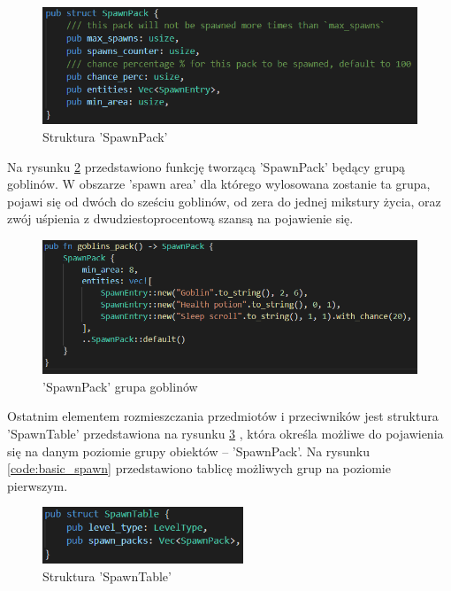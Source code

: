 \documentclass[12pt,twoside]{article}
\begin{document}
\FloatBarrier
\begin{figure}[ht]
	\centering
	\includegraphics[width=16cm]{images/code/spawn_pack.png}
	\caption{Struktura 'SpawnPack'}
	\label{code:spawn_pack}
\end{figure}
\FloatBarrier

Na rysunku \ref{code:goblins_pack} przedstawiono funkcję tworzącą 'SpawnPack' będący grupą goblinów. W obszarze 'spawn area' dla którego wylosowana zostanie ta grupa, pojawi się od dwóch do sześciu goblinów, od zera do jednej mikstury życia, oraz zwój uśpienia z dwudziestoprocentową szansą na pojawienie się.

\FloatBarrier
\begin{figure}[ht]
	\centering
	\includegraphics[width=16cm]{images/code/goblins_pack.png}
	\caption{'SpawnPack' grupa goblinów}
	\label{code:goblins_pack}
\end{figure}
\FloatBarrier

Ostatnim elementem rozmieszczania przedmiotów i przeciwników jest struktura 'SpawnTable' przedstawiona na rysunku \ref{code:spawn_table} , która określa możliwe do pojawienia się na danym poziomie grupy obiektów -- 'SpawnPack'. Na rysunku \ref{code:basic_spawn} przedstawiono tablicę możliwych grup na poziomie pierwszym.

\FloatBarrier
\begin{figure}[ht]
	\centering
	\includegraphics[width=6cm]{images/code/spawn_table.png}
	\caption{Struktura 'SpawnTable'}
	\label{code:spawn_table}
\end{figure}
\FloatBarrier
\end{document}
